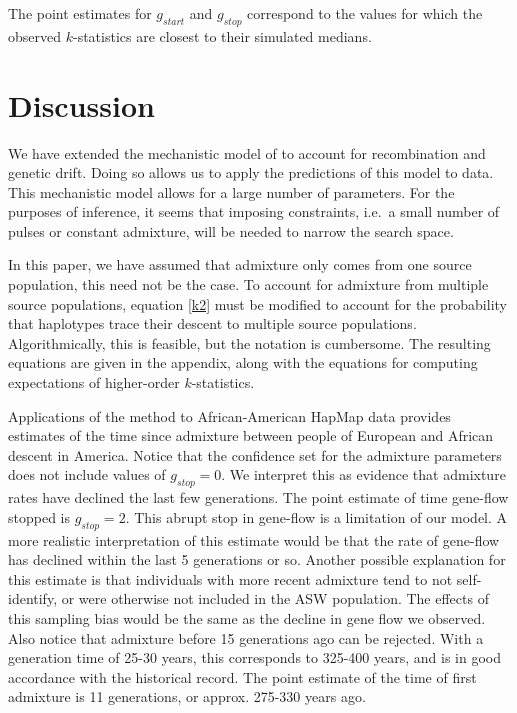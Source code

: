 \documentclass[11pt]{amsart}
\begin{document}

The point estimates for $g_{start}$ and $g_{stop}$ correspond to the values for which the observed $k$-statistics are closest to their simulated medians. 
 
\section*{Discussion}
We have extended the mechanistic model of \citet{verdu2011general} to account for recombination and genetic drift. Doing so allows us to apply the predictions of this model to data. This mechanistic model allows for a large number of parameters. For the purposes of inference, it seems that imposing constraints, i.e.\ a small number of pulses or constant admixture, will be needed to narrow the search space.

In this paper, we have assumed that admixture only comes from one source population, this need not be the case. To account for admixture from multiple source populations, equation \ref{k2} must be modified to account for the probability that haplotypes trace their descent to multiple source populations. Algorithmically, this is feasible, but the notation is cumbersome. The resulting equations are given in the appendix, along with the equations for computing expectations of higher-order $k$-statistics.

Applications of the method to African-American HapMap data provides estimates of the time since admixture between people of European and African descent in America.  Notice that the confidence set for the admixture parameters does not include values of $g_{stop} = 0$.  We interpret this as evidence that admixture rates have declined the last few generations.  The point estimate of time gene-flow stopped is $g_{stop} = 2$.  This abrupt stop in gene-flow is a limitation of our model. A more realistic interpretation of this estimate would be that the rate of gene-flow has declined within the last 5 generations or so. Another possible explanation for this estimate is that individuals with more recent admixture tend to not self-identify, or were otherwise not included in the ASW population. The effects of this sampling bias would be the same as the decline in gene flow we observed. Also notice that admixture before 15 generations ago can be rejected.  With a generation time of 25-30 years, this corresponds to 325-400 years, and is in good accordance with the historical record.  The point estimate of the time of first admixture is 11 generations, or approx. 275-330 years ago. 
\end{document}
